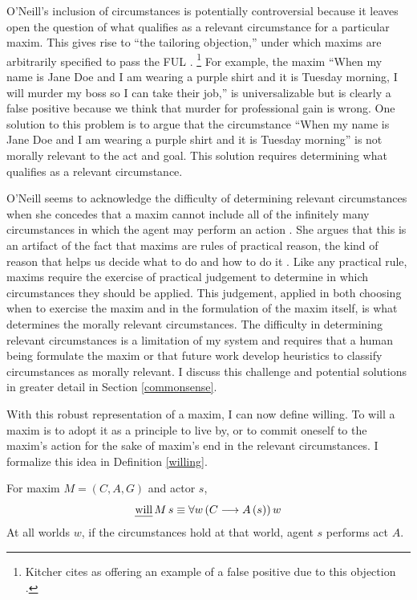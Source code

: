 \begin{isabellebody}
\begin{isamarkuptext}
O'Neill's inclusion of circumstances is potentially controversial because it leaves open the question of what qualifies as a 
relevant circumstance for a particular maxim. This gives rise to ``the tailoring objection,'' 
under which maxims are arbitrarily specified to pass the FUL  \citep[217]{whatisamaxim}. \footnote{Kitcher
cites \citet{kantsethicalthought} as offering an example of a false positive due to this objection \cite{kitcher}.} For example, the maxim ``When my name is Jane Doe
and I am wearing a purple shirt and it is Tuesday morning, I will murder my boss so I can take their job,'' 
is universalizable but is clearly a false positive because we think that murder for professional gain is wrong. 
One solution to this problem is to argue that the circumstance ``When my name is Jane Doe and I am wearing a 
purple shirt and it is Tuesday morning'' is not morally relevant 
to the act and goal. This solution requires determining what qualifies as a relevant circumstance.

O'Neill seems to acknowledge the difficulty of determining relevant circumstances when she concedes that a maxim cannot include all 
of the infinitely many circumstances in which the agent may perform an action \citep[4:428]{actingonprinciple}. She argues that this is 
an artifact of the fact that maxims are rules of practical reason, the kind of reason that helps us decide what to do 
and how to do it \citep{bok}. Like any practical rule, 
maxims require the exercise of practical judgement to determine in which circumstances they should be applied. 
This judgement, applied in both choosing when to exercise the maxim and in the formulation of the maxim 
itself, is what determines the morally relevant circumstances.  
The difficulty in determining relevant circumstances is a limitation of my system and requires that a 
human being formulate the maxim or that future work develop heuristics to classify circumstances as morally 
relevant. I discuss this challenge and potential solutions in greater detail in Section \ref{commonsense}.

With this robust representation of a maxim, I can now define willing. To will a maxim is to adopt it 
as a principle to live by, or to commit oneself to the maxim's action for the 
sake of maxim's end in the relevant circumstances. I formalize this idea in Definition \ref{willing}.

\begin{definition}[Willing]\label{willing}
For maxim $M = (C, A, G)$ and actor $s$,
$$\text{\emph{will}} \, M \, s \equiv \forall w \, (C \longrightarrow A \, (s)) \, w$$
\noindent At all worlds $w$, if the circumstances hold at that world, agent $s$ performs act $A$.


\end{definition}
\end{isamarkuptext}
\end{isabellebody}
